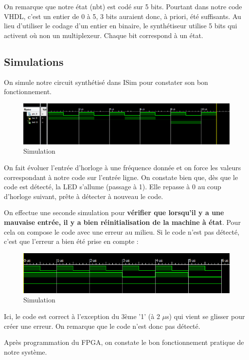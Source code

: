 On remarque que notre état (nbt) est codé sur 5 bits. Pourtant dans notre code VHDL, c'est un entier de 0 à 5, 3 bits auraient donc, à priori, été suffisants.
Au lieu d'utiliser le codage d'un entier en binaire, le synthétiseur utilise 5 bits qui activent où non un multiplexeur. Chaque bit correspond à un état.

\subsection{Simulations}

On simule notre circuit synthétisé dans ISim pour constater son bon fonctionnement.
\begin{figure}[!h]
   \centering\includegraphics[width=\textwidth]{files/tp2_2/simulateur.png}
   \caption{Simulation}
\end{figure}

On fait évoluer l'entrée d'horloge à une fréquence donnée et on force les valeurs correspondant à notre code sur l'entrée ligne. On constate bien que, dès que le code est détecté, la LED s'allume (passage à 1). Elle repasse à 0 au coup d'horloge suivant, prête à détecter à nouveau le code.

\medskip

On effectue une seconde simulation pour \textbf{vérifier que lorsqu'il y a une mauvaise entrée, il y a bien réinitialisation de la machine à état}. Pour cela on compose le code avec une erreur au milieu. Si le code n'est pas détecté, c'est que l'erreur a bien été prise en compte :
\begin{figure}[!h]
   \centering\includegraphics[width=\textwidth]{files/tp2_2/simu_erreur.png}
   \caption{Simulation}
\end{figure}

Ici, le code est correct à l'exception du 3ème '1' (à 2 $\mu$s) qui vient se glisser pour créer une erreur. On remarque que le code n'est donc pas détecté.

\bigskip

Après programmation du FPGA, on constate le bon fonctionnement pratique de notre système.

\newpage